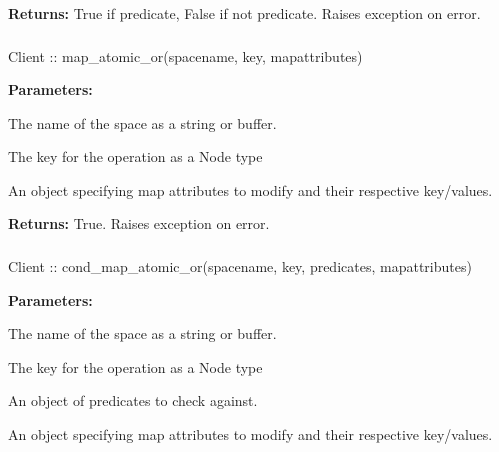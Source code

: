 \noindent\textbf{Returns:}
True if predicate, False if not predicate.  Raises exception on error.

\subsubsection{}
\label{api:nodejs:map_atomic_or}
\begin{javascriptcode}
Client :: map_atomic_or(spacename, key, mapattributes)
\end{javascriptcode}
\funcdesc 

\noindent\textbf{Parameters:}
\begin{description}[labelindent=\widthof{{\code{mapattributes}}},leftmargin=*,noitemsep,nolistsep,align=right]
\item[\code{spacename}] The name of the space as a string or buffer.
\item[\code{key}] The key for the operation as a Node type
\item[\code{mapattributes}] An object specifying map attributes to modify and their respective key/values.
\end{description}

\noindent\textbf{Returns:}
True.  Raises exception on error.

\subsubsection{}
\label{api:nodejs:cond_map_atomic_or}
\begin{javascriptcode}
Client :: cond_map_atomic_or(spacename, key, predicates, mapattributes)
\end{javascriptcode}
\funcdesc 

\noindent\textbf{Parameters:}
\begin{description}[labelindent=\widthof{{\code{mapattributes}}},leftmargin=*,noitemsep,nolistsep,align=right]
\item[\code{spacename}] The name of the space as a string or buffer.
\item[\code{key}] The key for the operation as a Node type
\item[\code{predicates}] An object of predicates to check against.
\item[\code{mapattributes}] An object specifying map attributes to modify and their respective key/values.
\end{description}

